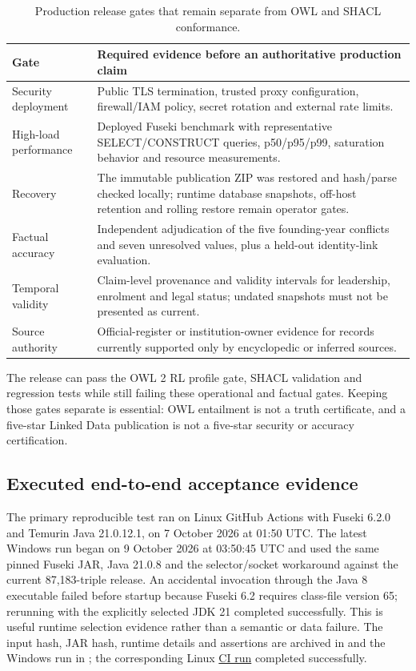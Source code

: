 \begin{table}[htbp]\centering\small
\caption{Production release gates that remain separate from OWL and SHACL conformance.}
\label{tab:production-gates}
\begin{tabularx}{\textwidth}{p{4.2cm}X}\toprule
Gate & Required evidence before an authoritative production claim \\\midrule
Security deployment & Public TLS termination, trusted proxy configuration, firewall/IAM policy, secret rotation and external rate limits. \\
High-load performance & Deployed Fuseki benchmark with representative SELECT/CONSTRUCT queries, p50/p95/p99, saturation behavior and resource measurements. \\
Recovery & The immutable publication ZIP was restored and hash/parse checked locally; runtime database snapshots, off-host retention and rolling restore remain operator gates. \\
Factual accuracy & Independent adjudication of the five founding-year conflicts and seven unresolved values, plus a held-out identity-link evaluation. \\
Temporal validity & Claim-level provenance and validity intervals for leadership, enrolment and legal status; undated snapshots must not be presented as current. \\
Source authority & Official-register or institution-owner evidence for records currently supported only by encyclopedic or inferred sources. \\
\bottomrule\end{tabularx}
\end{table}

The release can pass the OWL 2 RL profile gate, SHACL validation and regression tests while
still failing these operational and factual gates. Keeping those gates separate is essential:
OWL entailment is not a truth certificate, and a five-star Linked Data publication is not a
five-star security or accuracy certification.

\subsection{Executed end-to-end acceptance evidence}
The primary reproducible test ran on Linux GitHub Actions with Fuseki 6.2.0 and Temurin Java 21.0.12.1,
on 7 October 2026 at 01:50 UTC. The latest Windows run began on 9 October 2026 at
03:50:45 UTC and used the same pinned Fuseki JAR, Java 21.0.8 and the selector/socket
workaround against the current 87,183-triple release. An accidental invocation through the
Java 8 executable failed before startup because Fuseki 6.2 requires class-file version 65;
rerunning with the explicitly selected JDK 21 completed successfully. This is useful runtime
selection evidence rather than a semantic or data failure.
The input hash, JAR hash, runtime details and assertions are archived in
 and the Windows run in
; the corresponding Linux
\href{https://github.com/pham-ng/Vietnam-University-Knowledge-Graph-ver2/actions/runs/37559070543}{CI run}
completed successfully.

